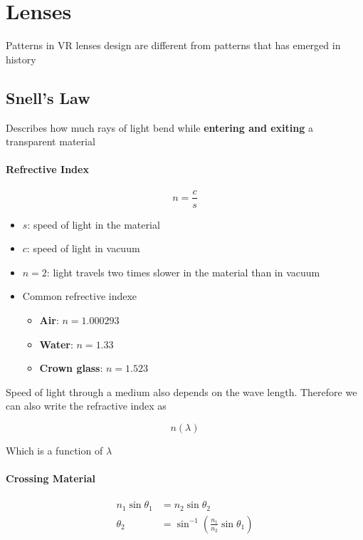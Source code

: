 \section{Lenses}

Patterns in VR lenses design are different from patterns that has emerged
in history

\subsection{Snell's Law}

  Describes how much rays of light bend while \textbf{entering and exiting} a
  transparent material

  \paragraph{Refrective Index}
  \begin{equation}
    n = \frac{c}{s}
  \end{equation}

  \begin{itemize}
    \item $ s $: speed of light in the material
    \item $ c $: speed of light in vacuum
    \item $ n = 2 $: light travels two times slower in the material than in
    vacuum
    \item Common refrective indexe
    \begin{itemize}
      \item \textbf{Air}: $ n = 1.000293 $
      \item \textbf{Water}: $ n = 1.33 $
      \item \textbf{Crown glass}: $ n = 1.523 $
    \end{itemize}
  \end{itemize}

  Speed of light through a medium also depends on the wave length. Therefore
  we can also write the refractive index as

  \begin{equation}
    n\left( \lambda \right)
  \end{equation}

  Which is a function of $ \lambda $

  \paragraph{Crossing Material}
  \begin{align}
    n_{1} \sin \theta_{1} &= n_{2} \sin \theta_{2} \\
    \theta_{2} &= \sin^{-1} \left( \frac{n_{1}}{n_{2}} \sin \theta_{1} \right)
  \end{align}

